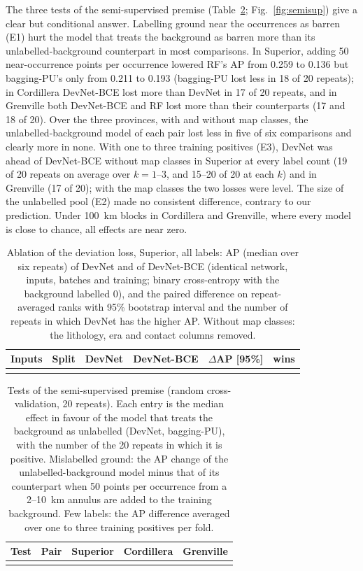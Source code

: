 \documentclass[pdflatex,sn-apa]{sn-jnl}
\begin{document}
The three tests of the semi-supervised premise (Table~\ref{tab:semisup}; Fig.~\ref{fig:semisup}) give a clear but conditional answer. Labelling ground near the occurrences as barren (E1) hurt the model that treats the background as barren more than its unlabelled-background counterpart in most comparisons. In Superior, adding 50 near-occurrence points per occurrence lowered RF's AP from 0.259 to 0.136 but bagging-PU's only from 0.211 to 0.193 (bagging-PU lost less in 18 of 20 repeats); in Cordillera DevNet-BCE lost more than DevNet in 17 of 20 repeats, and in Grenville both DevNet-BCE and RF lost more than their counterparts (17 and 18 of 20). Over the three provinces, with and without map classes, the unlabelled-background model of each pair lost less in five of six comparisons and clearly more in none. With one to three training positives (E3), DevNet was ahead of DevNet-BCE without map classes in Superior at every label count (19 of 20 repeats on average over $k = 1$--3, and 15--20 of 20 at each $k$) and in Grenville (17 of 20); with the map classes the two losses were level. The size of the unlabelled pool (E2) made no consistent difference, contrary to our prediction. Under 100~km blocks in Cordillera and Grenville, where every model is close to chance, all effects are near zero.

\begin{table}[t]
\caption{Ablation of the deviation loss, Superior, all labels: AP (median over six repeats) of DevNet and of DevNet-BCE (identical network, inputs, batches and training; binary cross-entropy with the background labelled 0), and the paired difference on repeat-averaged ranks with 95\% bootstrap interval and the number of repeats in which DevNet has the higher AP. Without map classes: the lithology, era and contact columns removed.}\label{tab:loss-ablation}
\footnotesize
\setlength{\tabcolsep}{3pt}
\begin{tabular*}{\textwidth}{@{\extracolsep\fill}llcccc}
\toprule
Inputs & Split & DevNet & DevNet-BCE & $\Delta$AP [95\%] & wins \\
\midrule
\botrule
\end{tabular*}
\end{table}

\begin{table}[t]
\caption{Tests of the semi-supervised premise (random cross-validation, 20 repeats). Each entry is the median effect in favour of the model that treats the background as unlabelled (DevNet, bagging-PU), with the number of the 20 repeats in which it is positive. Mislabelled ground: the AP change of the unlabelled-background model minus that of its counterpart when 50 points per occurrence from a 2--10~km annulus are added to the training background. Few labels: the AP difference averaged over one to three training positives per fold.}\label{tab:semisup}
\footnotesize
\setlength{\tabcolsep}{3pt}
\begin{tabular*}{\textwidth}{@{\extracolsep\fill}p{2.6cm}p{3.2cm}ccc}
\toprule
Test & Pair & Superior & Cordillera & Grenville \\
\midrule
\botrule
\end{tabular*}
\end{table}
\end{document}
